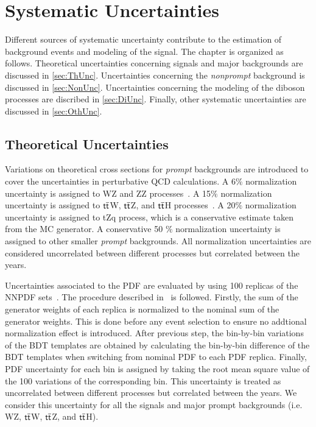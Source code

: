 \chapter{Systematic Uncertainties}
\label{chap:Systematics}

Different sources of systematic uncertainty contribute to the estimation of background events and modeling of the signal. The chapter is organized as follows. Theoretical uncertainties concerning signals and major backgrounds are discussed in \autoref{sec:ThUnc}. Uncertainties concerning the \emph{nonprompt} background is discussed in \autoref{sec:NonUnc}. Uncertainties concerning the modeling of the diboson processes are discribed in \autoref{sec:DiUnc}. Finally, other systematic uncertainties are discussed in \autoref{sec:OthUnc}.

\section{Theoretical Uncertainties}
\label{sec:ThUnc}

Variations on theoretical cross sections for \emph{prompt} backgrounds are introduced to cover the uncertainties in perturbative \ac{QCD} calculations.  A 6$\%$ normalization uncertainty is assigned to WZ and ZZ processes~\cite{Campbell:2011bn}. A 15$\%$ normalization uncertainty is assigned to $\textsf{t}\overline{\textsf{t}}$W, $\textsf{t}\overline{\textsf{t}}$Z, and $\textsf{t}\overline{\textsf{t}}$H processes~\cite{Frederix:2021agh,Kulesza:2020nfh}. A 20$\%$ normalization uncertainty is assigned to tZq process, which is a conservative estimate taken from the MC generator. A conservative 50 $\%$ normalization uncertainty is assigned to other smaller \emph{prompt} backgrounds. All normalization uncertainties are considered uncorrelated between different processes but correlated between the years. 

Uncertainties associated to the \ac{PDF} are evaluated by using 100 replicas of the NNPDF sets~\cite{NNPDF:2014otw,NNPDF:2017mvq}. The procedure described in~\cite{CMS:2012nsv} is followed. Firstly, the sum of the generator weights of each replica is normalized to the nominal sum of the generator weights. This is done before any event selection to ensure no addtional normalization effect is introduced. After previous step, the bin-by-bin variations of the \ac{BDT} templates are obtained by calculating the bin-by-bin difference of the \ac{BDT} templates when switching from nominal \ac{PDF} to each \ac{PDF} replica. Finally, \ac{PDF} uncertainty for each bin is assigned by taking the root mean square value of the 100 variations of the corresponding bin. This uncertainty is treated as uncorrelated between different processes but correlated between the years.  We consider this uncertainty for all the signals and major prompt backgrounds (i.e. WZ, $\textsf{t}\overline{\textsf{t}}$W, $\textsf{t}\overline{\textsf{t}}$Z, and $\textsf{t}\overline{\textsf{t}}$H).

